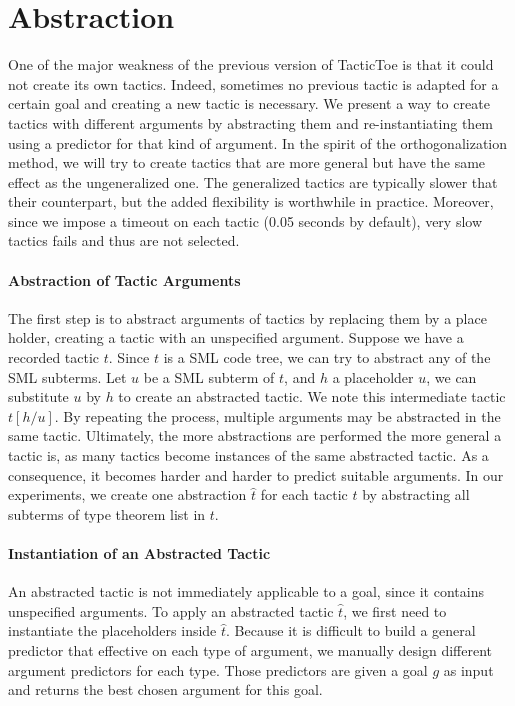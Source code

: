 \documentclass[runningheads,a4paper,draft]{svjour3}
\def\sml{\textsf{SML}\xspace}
\def\tactictoe{\textsf{TacticToe}\xspace}
\begin{document}
\section{Abstraction}\label{sec:synthesis}
One of the major weakness of the previous version of \tactictoe is that
it could not create its own tactics. Indeed, sometimes no previous tactic is
adapted for a certain goal and creating a new tactic is necessary.
We present a way to create tactics with different arguments
by abstracting them and re-instantiating them using a predictor for that kind
of argument. In the spirit of the orthogonalization method, we will try to
create tactics that are more general but have the same effect as the
ungeneralized one. The generalized tactics are typically slower that their 
counterpart, but the added flexibility is worthwhile in practice. Moreover, 
since we impose a timeout on each tactic (0.05 seconds by default), very slow 
tactics fails and thus are not selected.

\paragraph{Abstraction of Tactic Arguments}
The first step is to abstract arguments of tactics by replacing them by a
place holder, creating a tactic with an unspecified argument.
Suppose we have a recorded tactic $t$. Since $t$ is a \sml code tree, we can
try to abstract any of the
\sml subterms. Let $u$ be a \sml subterm of $t$, and $h$ a placeholder $u$, we
can substitute $u$ by $h$ to create an abstracted tactic.
We note this intermediate tactic $t[h/u]$. By repeating the
process, multiple
arguments may be abstracted in the same tactic. Ultimately, the more
abstractions are performed the more general a tactic is, as many tactics
become instances of the same abstracted tactic. As a consequence, it becomes 
harder and harder to predict suitable arguments. In our experiments, we create 
one abstraction $\hat{t}$ for each tactic $t$ by abstracting all subterms of 
type theorem list in $t$.

\paragraph{Instantiation of an Abstracted Tactic}
An abstracted tactic is not immediately applicable to a goal, since it contains
unspecified arguments. To apply an abstracted tactic $\hat{t}$, we first need
to
instantiate the placeholders inside $\hat{t}$. Because it is difficult to
build a general predictor that effective on each type of argument, we manually
design different argument predictors for each type. Those predictors are
given a goal $g$ as input and returns the best chosen argument for this
goal.
\end{document}

